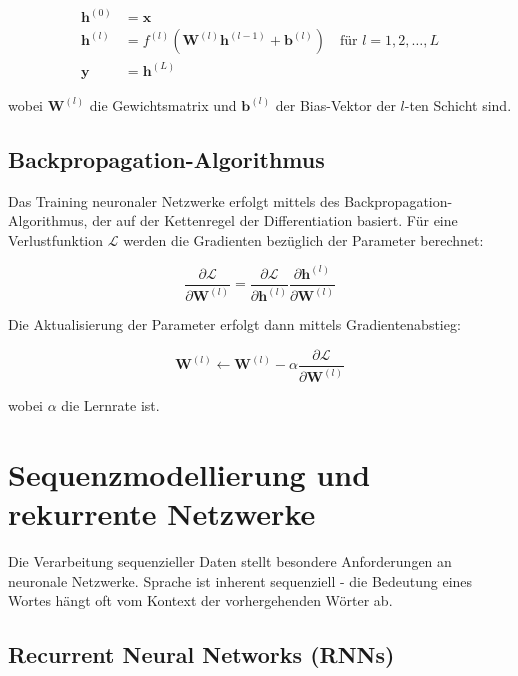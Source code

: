 \begin{align}
\mathbf{h}^{(0)} &= \mathbf{x} \\
\mathbf{h}^{(l)} &= f^{(l)}\left(\mathbf{W}^{(l)} \mathbf{h}^{(l-1)} + \mathbf{b}^{(l)}\right) \quad \text{für } l = 1, 2, \ldots, L \\
\mathbf{y} &= \mathbf{h}^{(L)}
\end{align}

wobei $\mathbf{W}^{(l)}$ die Gewichtsmatrix und $\mathbf{b}^{(l)}$ der Bias-Vektor der $l$-ten Schicht sind.

\subsection{Backpropagation-Algorithmus}

Das Training neuronaler Netzwerke erfolgt mittels des Backpropagation-Algorithmus, der auf der Kettenregel der Differentiation basiert. Für eine Verlustfunktion $\mathcal{L}$ werden die Gradienten bezüglich der Parameter berechnet:

\begin{equation}
\frac{\partial \mathcal{L}}{\partial \mathbf{W}^{(l)}} = \frac{\partial \mathcal{L}}{\partial \mathbf{h}^{(l)}} \frac{\partial \mathbf{h}^{(l)}}{\partial \mathbf{W}^{(l)}}
\end{equation}

Die Aktualisierung der Parameter erfolgt dann mittels Gradientenabstieg:

\begin{equation}
\mathbf{W}^{(l)} \leftarrow \mathbf{W}^{(l)} - \alpha \frac{\partial \mathcal{L}}{\partial \mathbf{W}^{(l)}}
\end{equation}

wobei $\alpha$ die Lernrate ist.

\section{Sequenzmodellierung und rekurrente Netzwerke}

Die Verarbeitung sequenzieller Daten stellt besondere Anforderungen an neuronale Netzwerke. Sprache ist inherent sequenziell - die Bedeutung eines Wortes hängt oft vom Kontext der vorhergehenden Wörter ab.

\subsection{Recurrent Neural Networks (RNNs)}

